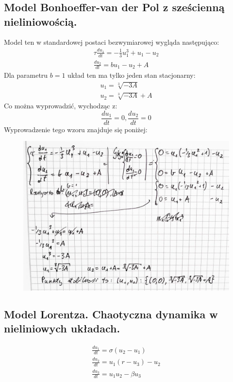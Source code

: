 \documentclass[12pt]{article}
\begin{document}
\subsection{Model Bonhoeffer-van der Pol z sześcienną nieliniowością.}
Model ten w standardowej postaci bezwymiarowej wygląda następująco:
\begin{equation}
\begin{split}
\tau \frac{du_1}{dt} = -\frac{1}{3}u_1^{3} + u_1 - u_2  \\
\frac{du_2}{dt} = b u_1 - u_2 + A
\end{split}
\label{equation-1}
\end{equation}
Dla parametru $b=1$ układ ten ma tylko jeden stan stacjonarny:
\begin{equation}
\begin{split}
u_1 = \sqrt[3]{-3A} \\
u_2 = \sqrt[3]{-3A} + A
\end{split}
\label{equation-1}
\end{equation}
Co można wyprowadzić, wychodząc z: 
$$ \frac{du_1}{dt} = 0, \frac{du_2}{dt} = 0 $$
Wyprowadzenie tego wzoru znajduje się poniżej:
\begin{figure}[H]
\centering
    \includegraphics[scale=0.28]{./img/stability-1}
\end{figure}

\subsection{Model Lorentza. Chaotyczna dynamika w nieliniowych układach.}

\begin{equation}
\begin{split}
\frac{du_1}{dt} = \sigma (u_2 - u_1) \\
\frac{du_2}{dt} = u_1 (r - u_3) - u_2 \\
\frac{du_3}{dt} = u_1 u_2 - \beta u_3
\end{split}
\label{equation-2}
\end{equation}
\end{document}
